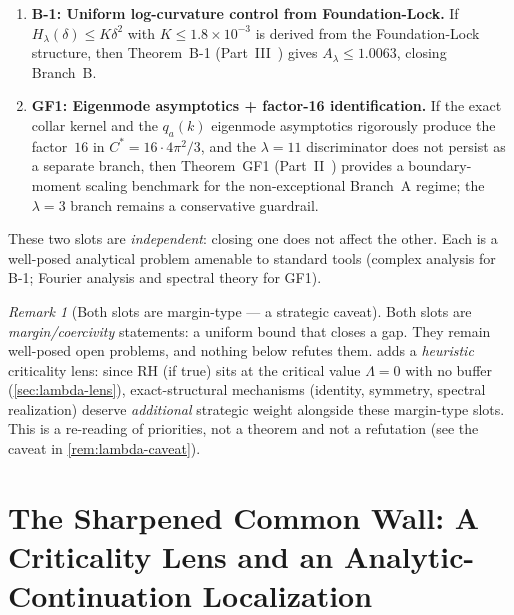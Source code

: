 \documentclass[12pt,a4paper]{article}
\theoremstyle{definition}
\theoremstyle{remark}
\newtheorem{remark}[theorem]{Remark}
\begin{document}
\begin{enumerate}
  \item \textbf{B-1: Uniform log-curvature control from Foundation-Lock.}
    If $H_\lambda(\delta) \leq K\delta^2$ with
    $K \leq 1.8\times 10^{-3}$ is derived from the Foundation-Lock
    structure, then Theorem~B-1
    (Part~III~\cite{Geiger2026partIII}) gives
    $A_\lambda \leq 1.0063$, closing Branch~B.
  \item \textbf{GF1: Eigenmode asymptotics + factor-16 identification.}
    If the exact collar kernel and the $q_a(k)$ eigenmode asymptotics
    rigorously produce the factor~$16$ in
    $C^* = 16\cdot 4\pi^2/3$, and the $\lambda=11$ discriminator does not
    persist as a separate branch, then
    Theorem~GF1 (Part~II~\cite{Geiger2026partII}) provides a
    boundary-moment scaling benchmark for the non-exceptional Branch~A
    regime; the $\lambda=3$ branch remains a conservative guardrail.
\end{enumerate}

These two slots are \emph{independent}: closing one does not affect the
other. Each is a well-posed analytical problem amenable to standard tools
(complex analysis for B-1; Fourier analysis and spectral theory for GF1).

\begin{remark}[Both slots are margin-type --- a strategic caveat]
\label{rem:slots-margin}
Both slots are \emph{margin/coercivity} statements: a uniform bound that closes a
gap. They remain well-posed open problems, and nothing below refutes them.
 adds a \emph{heuristic} criticality lens: since RH (if
true) sits at the critical value $\Lambda=0$ with no buffer
(\cref{sec:lambda-lens}), exact-structural mechanisms (identity, symmetry,
spectral realization) deserve \emph{additional} strategic weight alongside these
margin-type slots. This is a re-reading of priorities, not a theorem and not a
refutation (see the caveat in \cref{rem:lambda-caveat}).
\end{remark}


\section{The Sharpened Common Wall: A Criticality Lens and an Analytic-Continuation Localization}
\label{sec:sharpened-wall}
\end{document}

